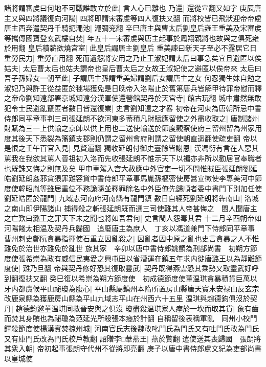 諸將謂審䖍曰何地不可戰誰敢立於此|{
	言人心已離也}
乃還|{
	還從宣翻又如字}
庚辰唐主又與四將議復向河陽|{
	四將即謂宋審䖍等四人復扶又翻}
而將校皆已飛狀迎帝帝慮唐主西奔遣契丹千騎扼澠池|{
	澠彌兖翻}
辛巳唐主與曹太后劉皇后雍王重美及宋審䖍等攜傳國寶登玄武樓自焚|{
	年五十一宋審䖍與唐主起事於鳳翔親將也故與之俱死雍於用翻}
皇后積薪欲燒宫室|{
	此皇后謂唐主劉皇后}
重美諫曰新天子至必不露居它日重勞民力|{
	重勞直用翻}
死而遺怨將安用之乃止王淑妃謂太后曰事急矣宜且避匿以俟姑夫|{
	太后曹太后也姑夫謂帝也皇后曹太后之女故王淑妃使之避匿以俟帝來}
太后曰吾子孫婦女一朝至此|{
	子謂唐主孫謂重美婦謂劉后女謂唐主之女}
何忍獨生妹自勉之淑妃乃與許王從益匿於毬場獲免是日晩帝入洛陽止於舊第唐兵皆解甲待罪帝慰而釋之帝命劉知遠部署京城知遠分漢軍使還營館契丹於天宫寺|{
	館古玩翻}
城中肅然無敢犯令士民避亂竄匿者數日皆還復業|{
	史言劉知遠之才畧}
初帝在河東為唐朝所忌中書侍郎同平章事判三司張延朗不欲河東多蓄積凡財賦應留使之外盡收取之|{
	唐制諸州財賦為三一上供輸之京師以供上用也二送使輸送於節度觀察使府三留州留為州家用度其後天下悉裂為籓鎮支郡則仍謂之留州會府則謂之留使朝直遥翻使疏吏翻}
帝以是恨之壬午百官入見|{
	見賢遍翻}
獨收延朗付御史臺餘皆謝恩|{
	漢馮衍有言在人惡其罵我在我欲其罵人晉祖初入洛而先收張延朗不惟示天下以褊亦非所以勸居官奉職者也既誅又悔之則無及矣}
甲申車駕入宫大赦應中外官吏一切不問惟賊臣張延朗劉延皓劉延朗姦邪貪猥罪難容貸中書侍郎平章事馬胤孫樞密使房暠宣徽使李專美河中節度使韓昭胤等雖居重位不務詭隨並釋罪除名中外臣僚先歸順者委中書門下别加任使劉延皓匿於龍門|{
	九域志河南府河南縣有龍門鎮}
數日自經死劉延朗將犇南山|{
	洛城之南山即伊陽諸山}
捕得殺之斬張延朗既而選三司使難其人帝甚悔之　閩人聞唐主之亡歎曰潞王之罪天下未之聞也將如吾君何|{
	史言閩人怨毒其君}
十二月辛酉朔帝如河陽餞太相温及契丹兵歸國　追廢唐主為庶人　丁亥以馮道兼門下侍郎同平章事　曹州刺史鄭阮貪暴指揮使石重立因亂殺之|{
	因亂者因中原之亂也史言貪暴之人不惟難免於治世亦難免於亂世}
族其家　辛卯以唐中書侍郎姚顗為刑部尚書　初朔方節度使張希崇為政有威信民夷愛之興屯田以省漕運在鎮五年求内徙唐潞王以為靜難節度使|{
	難乃旦翻}
帝與契丹修好恐其復取靈武|{
	契丹既得燕雲恐其乘勢又取靈武好呼到翻復扶又翻}
癸巳復以希崇為朔方節度使　初成德節度使董温琪貪暴積貨巨萬以牙内都虞候平山祕瓊為腹心|{
	平山縣屬鎮州本隋所置房山縣唐天寶末安禄山反玄宗改鹿泉縣為獲鹿房山縣為平山九域志平山在州西六十五里}
温琪與趙德鈞俱沒於契丹|{
	趙德鈞邀董温琪同救晉安與之俱沒}
瓊盡殺温琪家人瘞於一坎而取其貨|{
	象有齒而焚其身賄也為祕瓊為范延光所殺張本瘞於計翻}
自稱留後表稱軍亂　同州小校門鐸殺節度使楊漢賓焚掠州城|{
	河南官氏志後魏改叱門氏為門氏又有吐門氏改為門氏又有庫門氏改為門氏校戶教翻}
詔贈李□華燕王|{
	燕於贒翻}
遣使送其喪歸國　張朗將其衆入朝|{
	帝初起事張朗守代州不從將即亮翻}
庚子以唐中書侍郎盧文紀為吏部尚書以皇城使

